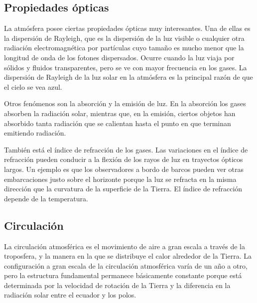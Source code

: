 \documentclass{article}
\begin{document}
\subsection{Propiedades ópticas}

La atmósfera posee ciertas propiedades ópticas muy interesantes. Una de ellas es la dispersión de Rayleigh, que es la dispersión de la luz visible o cualquier otra radiación electromagnética por partículas cuyo tamaño es mucho menor que la longitud de onda de los fotones dispersados. Ocurre cuando la luz viaja por sólidos y fluidos transparentes, pero se ve con mayor frecuencia en los gases. La dispersión de Rayleigh de la luz solar en la atmósfera es la principal razón de que el cielo se vea azul.

\vspace{0.5cm}


Otros fenómenos son la absorción y la emisión de luz. En la absorción los gases absorben la radiación solar, mientras que, en la emisión, ciertos objetos han absorbido tanta radiación que se calientan hasta el punto en que terminan emitiendo radiación.

\vspace{0.5cm}


También está el índice de refracción de los gases. Las variaciones en el índice de refracción pueden conducir a la flexión de los rayos de luz en trayectos ópticos largos. Un ejemplo es que los observadores a bordo de barcos pueden ver otras embarcaciones justo sobre el horizonte porque la luz se refracta en la misma dirección que la curvatura de la superficie de la Tierra.
El índice de refracción depende de la temperatura.

\subsection{Circulación}

La circulación atmosférica es el movimiento de aire a gran escala a través de la troposfera, y la manera en la que se distribuye el calor alrededor de la Tierra. La configuración a gran escala de la circulación atmosférica varía de un año a otro, pero la estructura fundamental permanece básicamente constante porque está determinada por la velocidad de rotación de la Tierra y la diferencia en la radiación solar entre el ecuador y los polos.

\vspace{0.5cm}
\end{document}
